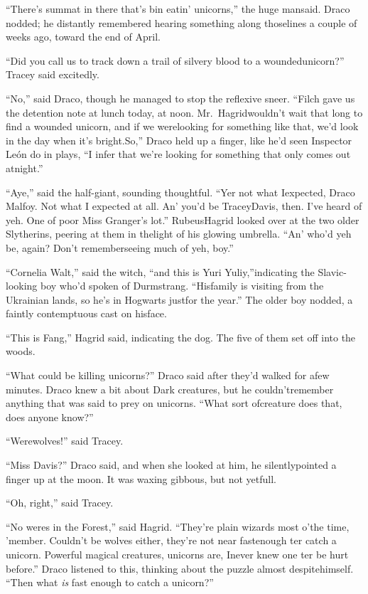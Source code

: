 ``There's summat in there that's bin eatin' unicorns,'' the huge mansaid.
Draco nodded; he distantly remembered hearing something along thoselines a couple of weeks ago, toward the end of April.

``Did you call us to track down a trail of silvery blood to a woundedunicorn?'' Tracey said excitedly.

``No,'' said Draco, though he managed to stop the reflexive sneer.
``Filch gave us the detention note at lunch today, at noon. Mr.~Hagridwouldn't wait that long to find a wounded unicorn, and if we werelooking for something like that, we'd look in the day when it's bright.So,'' Draco held up a finger, like he'd seen Inspector León do in plays,
``I infer that we're looking for something that only comes out atnight.''

``Aye,'' said the half-giant, sounding thoughtful. ``Yer not what Iexpected, Draco Malfoy. Not what I expected at all. An' you'd be TraceyDavis, then. I've heard of yeh. One of poor Miss Granger's lot.'' RubeusHagrid looked over at the two older Slytherins, peering at them in thelight of his glowing umbrella. ``An' who'd yeh be, again? Don't rememberseeing much of yeh, boy.''

``Cornelia Walt,'' said the witch, ``and this is Yuri Yuliy,''indicating the Slavic-looking boy who'd spoken of Durmstrang. ``Hisfamily is visiting from the Ukrainian lands, so he's in Hogwarts justfor the year.'' The older boy nodded, a faintly contemptuous cast on hisface.

``This is Fang,'' Hagrid said, indicating the dog.
The five of them set off into the woods.

``What could be killing unicorns?'' Draco said after they'd walked for afew minutes. Draco knew a bit about Dark creatures, but he couldn'tremember anything that was said to prey on unicorns. ``What sort ofcreature does that, does anyone know?''

``Werewolves!'' said Tracey.

``Miss Davis?'' Draco said, and when she looked at him, he silentlypointed a finger up at the moon. It was waxing gibbous, but not yetfull.

``Oh, right,'' said Tracey.

``No weres in the Forest,'' said Hagrid. ``They're plain wizards most o'the time, 'member. Couldn't be wolves either, they're not near fastenough ter catch a unicorn. Powerful magical creatures, unicorns are, Inever knew one ter be hurt before.''
Draco listened to this, thinking about the puzzle almost despitehimself. ``Then what \emph{is} fast enough to catch a unicorn?''

